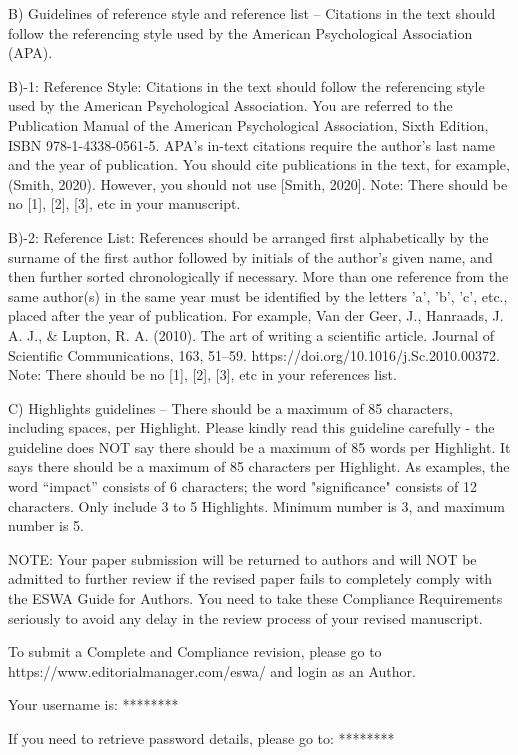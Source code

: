 \documentclass[12pt, review, authoryear]{elsarticle}
\begin{document}
B)  Guidelines of reference style and reference list – Citations in the text should follow the referencing style used by the American Psychological Association (APA).  

B)-1: Reference Style:
Citations in the text should follow the referencing style used by the American Psychological Association. You are referred to the Publication Manual of the American Psychological Association, Sixth Edition, ISBN 978-1-4338-0561-5.  APA’s in-text citations require the author’s last name and the year of publication. You should cite publications in the text, for example, (Smith, 2020).  However, you should not use [Smith, 2020]. Note: There should be no [1], [2], [3], etc in your manuscript. 

B)-2: Reference List:
References should be arranged first alphabetically by the surname of the first author followed by initials of the author’s given name, and then further sorted chronologically if necessary. More than one reference from the same author(s) in the same year must be identified by the letters 'a', 'b', 'c', etc., placed after the year of publication. For example, Van der Geer, J., Hanraads, J. A. J., \& Lupton, R. A. (2010). The art of writing a scientific article. Journal of Scientific Communications, 163, 51–59. {https://doi.org/10.1016/j.Sc.2010.00372}. Note: There should be no [1], [2], [3], etc in your references list. 

C) Highlights guidelines – There should be a maximum of 85 characters, including spaces, per Highlight. Please kindly read this guideline carefully - the guideline does NOT say there should be a maximum of 85 words per Highlight.  It says there should be a maximum of 85 characters per Highlight.  As examples, the word “impact” consists of 6 characters; the word "significance" consists of 12 characters. Only include 3 to 5 Highlights. Minimum number is 3, and maximum number is 5.

NOTE: Your paper submission will be returned to authors and will NOT be admitted to further review if the revised paper fails to completely comply with the ESWA Guide for Authors. You need to take these Compliance Requirements seriously to avoid any delay in the review process of your revised manuscript.

To submit a Complete and Compliance revision, please go to {https://www.editorialmanager.com/eswa/} and login as an Author. 

Your username is: ********

If you need to retrieve password details, please go to:
******** 
\end{document}
